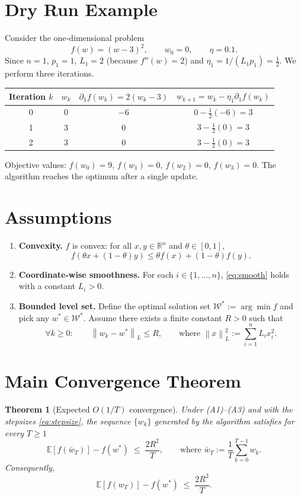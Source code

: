 \documentclass{article}
\newtheorem{theorem}{Theorem}
\newcommand{\E}{\mathbb{E}}
\newcommand{\R}{\mathbb{R}}
\newcommand{\norm}[1]{\left\lVert #1\right\rVert}
\begin{document}
\section*{Dry Run Example}
Consider the one‑dimensional problem
\[
f(w)=(w-3)^2,\qquad w_0=0,\qquad \eta=0.1 .
\]
Since $n=1$, $p_1=1$, $L_1=2$ (because $f''(w)=2$) and $\eta_1=1/(L_1p_1)=\tfrac12$.
We perform three iterations.

\begin{center}
\begin{tabular}{c|c|c|c}
Iteration $k$ & $w_k$ & $\partial_1 f(w_k)=2(w_k-3)$ & $w_{k+1}=w_k-\eta_1\partial_1 f(w_k)$\\\hline
0 & $0$ & $-6$ & $0-\tfrac12(-6)=3$\\
1 & $3$ & $0$ & $3-\tfrac12(0)=3$\\
2 & $3$ & $0$ & $3-\tfrac12(0)=3$
\end{tabular}
\end{center}

Objective values: $f(w_0)=9$, $f(w_1)=0$, $f(w_2)=0$, $f(w_3)=0$.
The algorithm reaches the optimum after a single update.

\newpage
\section*{Assumptions}
\begin{enumerate}
\item[(A1)] \textbf{Convexity.} $f$ is convex: for all $x,y\in\R^{n}$ and $\theta\in[0,1]$,
\[
f(\theta x+(1-\theta)y)\le \theta f(x)+(1-\theta)f(y).
\]

\item[(A2)] \textbf{Coordinate‑wise smoothness.} For each $i\in\{1,\dots,n\}$,
\eqref{eq:smooth} holds with a constant $L_i>0$.

\item[(A3)] \textbf{Bounded level set.}
Define the optimal solution set $\mathcal{W}^*:=\arg\min f$ and pick any
$w^*\in\mathcal{W}^*$.  Assume there exists a finite constant $R>0$ such that
\begin{equation}
\label{eq:bounded}
\forall k\ge0:\qquad \norm{w_k-w^*}_{L}\le R,
\qquad\text{where }\norm{x}_{L}^2:=\sum_{i=1}^{n}L_i x_i^{2}.
\end{equation}
\end{enumerate}

\section*{Main Convergence Theorem}
\begin{theorem}[Expected $O(1/T)$ convergence]
\label{thm:main}
Under (A1)–(A3) and with the stepsizes \eqref{eq:stepsize},
the sequence $\{w_k\}$ generated by the algorithm satisfies for every $T\ge1$
\[
\E\!\left[f\!\left(\bar w_T\right)\right]-f(w^*)
\;\le\;
\frac{2R^{2}}{T},
\qquad\text{where }\bar w_T:=\frac{1}{T}\sum_{k=0}^{T-1}w_k .
\]
Consequently,
\[
\E\!\left[f\!\left(w_T\right)\right]-f(w^*)\;\le\;\frac{2R^{2}}{T}.
\]
\end{theorem}
\end{document}
